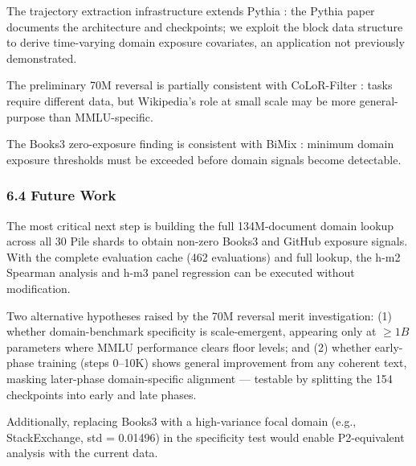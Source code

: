 The trajectory extraction infrastructure extends Pythia \citep{Biderman2023}: the Pythia paper documents the architecture and checkpoints; we exploit the block data structure to derive time-varying domain exposure covariates, an application not previously demonstrated.

The preliminary 70M reversal is partially consistent with CoLoR-Filter \citep{Brandfonbrener2024}: tasks require different data, but Wikipedia's role at small scale may be more general-purpose than MMLU-specific.

The Books3 zero-exposure finding is consistent with BiMix \citep{Ge2024}: minimum domain exposure thresholds must be exceeded before domain signals become detectable.

\subsubsection{6.4 Future Work}

The most critical next step is building the full 134M-document domain lookup across all 30 Pile shards to obtain non-zero Books3 and GitHub exposure signals. With the complete evaluation cache (462 evaluations) and full lookup, the h-m2 Spearman analysis and h-m3 panel regression can be executed without modification.

Two alternative hypotheses raised by the 70M reversal merit investigation: (1) whether domain-benchmark specificity is scale-emergent, appearing only at $\geq 1B$ parameters where MMLU performance clears floor levels; and (2) whether early-phase training (steps 0--10K) shows general improvement from any coherent text, masking later-phase domain-specific alignment --- testable by splitting the 154 checkpoints into early and late phases.

Additionally, replacing Books3 with a high-variance focal domain (e.g., StackExchange, std = 0.01496) in the specificity test would enable P2-equivalent analysis with the current data.

